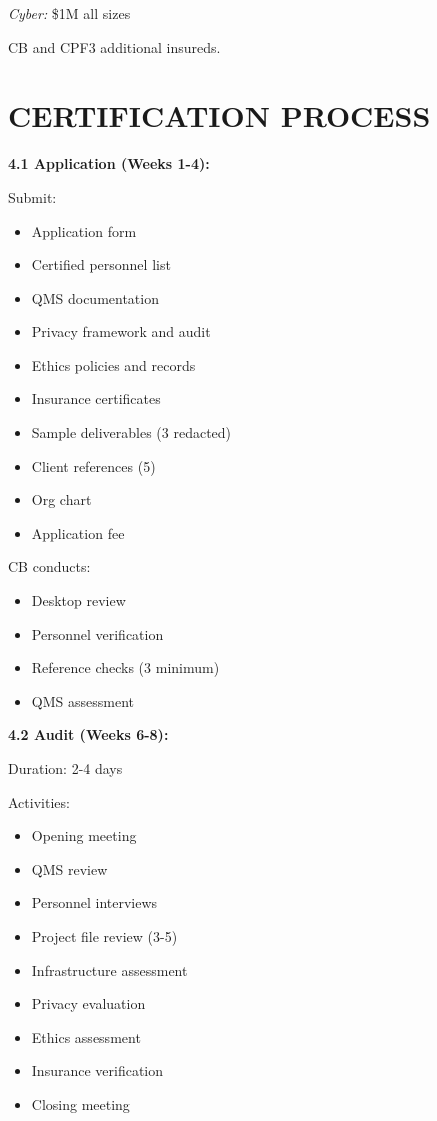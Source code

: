 \documentclass[11pt,a4paper]{article}
\begin{document}
\textit{Cyber:} \$1M all sizes

CB and CPF3 additional insureds.

\section{CERTIFICATION PROCESS}

\textbf{4.1 Application (Weeks 1-4):}

Submit:
\begin{itemize}
\item Application form
\item Certified personnel list
\item QMS documentation
\item Privacy framework and audit
\item Ethics policies and records
\item Insurance certificates
\item Sample deliverables (3 redacted)
\item Client references (5)
\item Org chart
\item Application fee
\end{itemize}

CB conducts:
\begin{itemize}
\item Desktop review
\item Personnel verification
\item Reference checks (3 minimum)
\item QMS assessment
\end{itemize}

\textbf{4.2 Audit (Weeks 6-8):}

Duration: 2-4 days

Activities:
\begin{itemize}
\item Opening meeting
\item QMS review
\item Personnel interviews
\item Project file review (3-5)
\item Infrastructure assessment
\item Privacy evaluation
\item Ethics assessment
\item Insurance verification
\item Closing meeting
\end{itemize}
\end{document}
